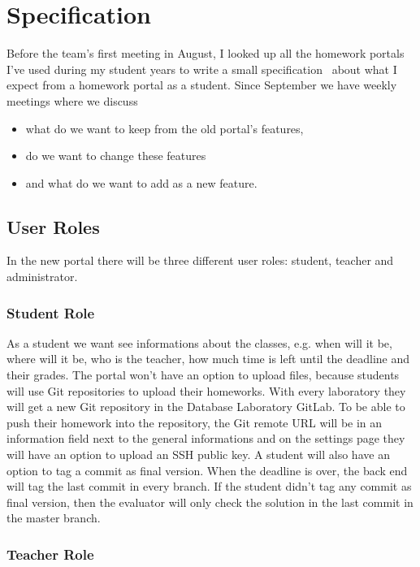 \chapter{Specification}

Before the team's first meeting in August, I looked up all the homework portals I've used during my student years to write a small specification~\cite{Szepes-specification} about what I expect from a homework portal as a student. Since September we have weekly meetings where we discuss 

\begin{itemize}
	\item what do we want to keep from the old portal's features,
	\item do we want to change these features
	\item and what do we want to add as a new feature.
\end{itemize}

\section{User Roles}

In the new portal there will be three different user roles: student, teacher and administrator. 

\subsection{Student Role}

As a student we want see informations about the classes, e.g. when will it be, where will it be, who is the teacher, how much time is left until the deadline and their grades. The portal won't have an option to upload files, because students will use Git repositories to upload their homeworks. With every laboratory they will get a new Git repository in the Database Laboratory GitLab. To be able to push their homework into the repository, the Git remote URL will be in an information field next to the general informations and on the settings page they will have an option to upload an SSH public key. A student will also have an option to tag a commit as final version. When the deadline is over, the back end will tag the last commit in every branch. If the student didn't tag any commit as final version, then the evaluator will only check the solution in the last commit in the master branch.

\subsection{Teacher Role}

